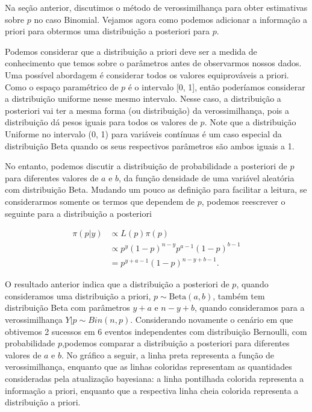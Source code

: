 \documentclass[]{book}
\begin{document}
Na seção anterior, discutimos o método de verossimilhança para obter estimativas sobre \(p\) no caso Binomial. Vejamos agora como podemos adicionar a informação a priori para obtermos uma distribuição a posteriori para \(p\).

Podemos considerar que a distribuição a priori deve ser a medida de conhecimento que temos sobre o parâmetros antes de observarmos nossos dados. Uma possível abordagem é considerar todos os valores equiprováveis a priori. Como o espaço paramétrico de \(p\) é o intervalo {[}0, 1{]}, então poderíamos considerar a distribuição uniforme nesse mesmo intervalo. Nesse caso, a distribuição a posteriori vai ter a mesma forma (ou distribuição) da verossimilhança, pois a distribuição dá pesos iguais para todos os valores de \(p\). Note que a distribuição Uniforme no intervalo (0, 1) para variáveis contínuas é um caso especial da distribuição Beta quando os seus respectivos parâmetros são ambos iguais a 1.

No entanto, podemos discutir a distribuição de probabilidade a posteriori de \(p\) para diferentes valores de \(a\) e \(b\), da função densidade de uma variável aleatória com distribuição Beta. Mudando um pouco as definição para facilitar a leitura, se considerarmos somente os termos que dependem de \(p\), podemos reescrever o seguinte para a distribuição a posteriori

\[
\begin{aligned} 
\pi(p| y) &\propto L(p) \pi(p) \\ 
&\propto p^{y} (1-p)^{n-y} p^{a - 1}(1-p)^{b-1} \\ 
&= p^{y + a - 1}(1-p)^{n - y + b - 1}.
\end{aligned}
\]

O resultado anterior indica que a distribuição a posteriori de \(p\), quando consideramos uma distribuição a priori, \(p \sim \mbox{Beta}(a, b)\), também tem distribuição Beta com parâmetros \(y + a\) e \(n - y + b\), quando consideramos para a verossimilhança \(Y|p \sim Bin(n, p)\). Considerando novamente o cenário em que obtivemos 2 sucessos em 6 eventos independentes com distribuição Bernoulli, com probabilidade \(p\),podemos comparar a distribuição a posteriori para diferentes valores de \(a\) e \(b\). No gráfico a seguir, a linha preta representa a função de verossimilhança, enquanto que as linhas coloridas representam as quantidades consideradas pela atualização bayesiana: a linha pontilhada colorida representa a informação a priori, enquanto que a respectiva linha cheia colorida representa a distribuição a priori.
\end{document}
